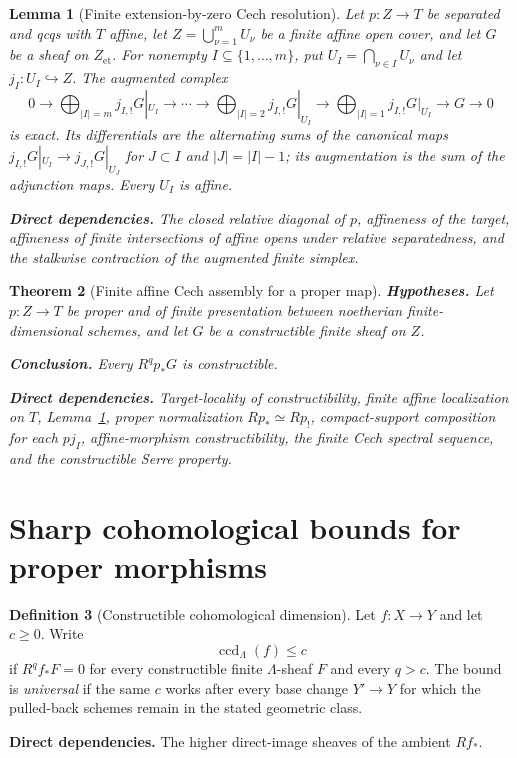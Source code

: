 \documentclass[10pt]{article}
\newtheorem{theorem}{Theorem}[section]
\newtheorem{lemma}[theorem]{Lemma}
\theoremstyle{definition}
\newtheorem{definition}[theorem]{Definition}
\newcommand{\deps}[1]{\par\smallskip\noindent\textbf{Direct dependencies.} #1}
\begin{document}
\begin{lemma}[Finite extension-by-zero Cech resolution]
\label{lem:finite-cech-resolution}
Let $p:Z\to T$ be separated and qcqs with $T$ affine, let
$Z=\bigcup_{\nu=1}^mU_\nu$ be a finite affine open cover, and let $G$ be a
sheaf on $Z_{\mathrm{et}}$.  For nonempty
$I\subseteq\{1,\ldots,m\}$, put
$U_I=\bigcap_{\nu\in I}U_\nu$ and let $j_I:U_I\hookrightarrow Z$.  The
augmented complex
\[
 0\to \bigoplus_{|I|=m}j_{I,!}G|_{U_I}\to\cdots\to
 \bigoplus_{|I|=2}j_{I,!}G|_{U_I}\to
 \bigoplus_{|I|=1}j_{I,!}G|_{U_I}\to G\to0
\]
is exact.  Its differentials are the alternating sums of the canonical maps
$j_{I,!}G|_{U_I}\to j_{J,!}G|_{U_J}$ for $J\subset I$ and
$|J|=|I|-1$; its augmentation is the sum of the adjunction maps.
Every $U_I$ is affine.
\deps{The closed relative diagonal of $p$, affineness of the target,
affineness of finite intersections of affine opens under relative
separatedness, and the stalkwise contraction of the augmented finite simplex.}
\end{lemma}

\begin{theorem}[Finite affine Cech assembly for a proper map]
\label{thm:cech-proper}
\textbf{Hypotheses.} Let $p:Z\to T$ be proper and of finite presentation
between noetherian finite-dimensional schemes, and let $G$ be a
constructible finite sheaf on $Z$.

\textbf{Conclusion.} Every $R^qp_*G$ is constructible.
\deps{Target-locality of constructibility, finite affine localization on
$T$, Lemma~\ref{lem:finite-cech-resolution}, proper normalization
$Rp_*\simeq Rp_!$, compact-support composition for each $pj_I$,
affine-morphism constructibility, the finite Cech spectral sequence, and the
constructible Serre property.}
\end{theorem}

\section{Sharp cohomological bounds for proper morphisms}

\begin{definition}[Constructible cohomological dimension]
Let $f:X\to Y$ and let $c\geq0$.  Write
\[
 \operatorname{ccd}_\Lambda(f)\leq c
\]
if $R^qf_*F=0$ for every constructible finite $\Lambda$-sheaf $F$ and every
$q>c$.  The bound is \emph{universal} if the same $c$ works after every base
change $Y'\to Y$ for which the pulled-back schemes remain in the stated
geometric class.
\deps{The higher direct-image sheaves of the ambient $Rf_*$.}
\end{definition}
\end{document}
